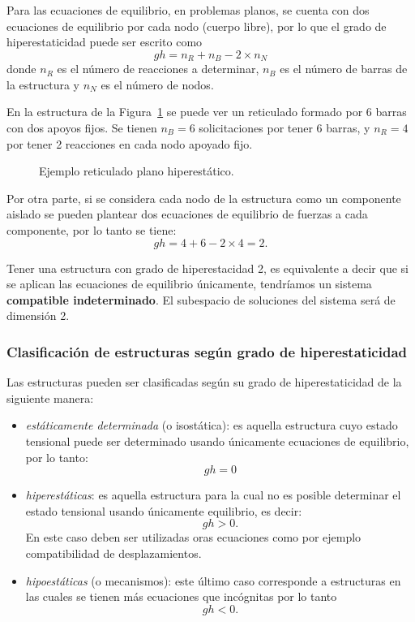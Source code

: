 Para las ecuaciones de equilibrio, en problemas planos, se cuenta con dos ecuaciones de equilibrio por cada nodo (cuerpo libre), por lo que el grado de hiperestaticidad puede ser escrito como
%
\begin{equation}
	\boxed{
	gh = n_R + n_{B} - 2 \times n_{N}
}
\end{equation}
%
donde $n_R$ es el número de reacciones a determinar, $n_B$ es el número de barras de la estructura y $n_N$ es el número de nodos.

En la estructura de la Figura~\ref{fig:retic_gh} se puede ver un reticulado formado por 6 barras con dos apoyos fijos. Se tienen $n_B=6$ solicitaciones por tener 6 barras, y $n_R=4$ por tener 2 reacciones en cada nodo apoyado fijo. %

\begin{figure}[htb]
	\centering
	\def\svgwidth{0.5\textwidth}
	
	\caption{Ejemplo reticulado plano hiperestático.}
	\label{fig:retic_gh}
\end{figure}

Por otra parte, si se considera cada nodo de la estructura como un componente aislado se pueden plantear dos ecuaciones de equilibrio de fuerzas a cada componente, por lo tanto se tiene:
%
\begin{equation}
	gh = 4 + 6 - 2 \times 4 = 2.
\end{equation}

Tener una estructura con grado de hiperestacidad 2, es equivalente a decir que si se aplican las ecuaciones de equilibrio únicamente, tendríamos un sistema \textbf{compatible indeterminado}. El subespacio de soluciones del sistema será de dimensión 2.




\subsubsection{Clasificación de estructuras según grado de hiperestaticidad} %

Las estructuras pueden ser clasificadas según su grado de hiperestaticidad de la siguiente manera:

\begin{itemize}
	\item \textit{estáticamente determinada} (o isostática): es aquella estructura cuyo estado tensional puede ser determinado usando únicamente ecuaciones de equilibrio, por lo tanto:
	$$
	gh = 0
	$$
	
	\item \textit{hiperestáticas}: es aquella estructura para la cual no es posible determinar el estado tensional usando únicamente equilibrio, es decir:
	$$
	gh > 0.
	$$
	En este caso deben ser utilizadas oras ecuaciones como por ejemplo compatibilidad de desplazamientos. %
	
	\item \textit{hipoestáticas} (o mecanismos): este último caso corresponde a estructuras en las cuales se tienen más ecuaciones que incógnitas por lo tanto
	$$
	gh <0.
	$$
\end{itemize}




